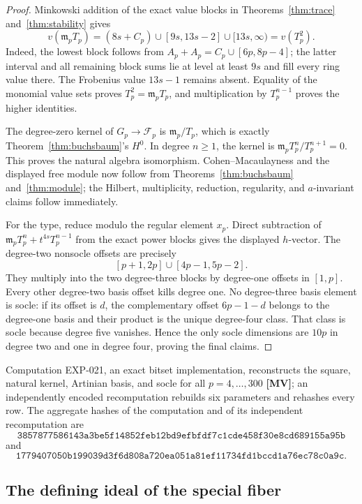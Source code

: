 \documentclass[11pt]{article}
\theoremstyle{definition}
\theoremstyle{remark}
\begin{document}
\begin{proof}
Minkowski addition of the exact value blocks in Theorems~\ref{thm:trace}
and~\ref{thm:stability} gives
\[
v(\mathfrak m_pT_p)=(8s+C_p)\cup[9s,13s-2]\cup[13s,\infty)=v(T_p^2).
\]
Indeed, the lowest block follows from
$A_p+A_p=C_p\cup[6p,8p-4]$; the latter interval and all remaining block sums lie at level at least
$9s$ and fill every ring value there. The Frobenius value $13s-1$ remains absent. Equality of the
monomial value sets proves $T_p^2=\mathfrak m_pT_p$, and multiplication by $T_p^{n-1}$ proves the
higher identities.

The degree-zero kernel of $G_p\to\mathcal F_p$ is $\mathfrak m_p/T_p$, which is exactly
Theorem~\ref{thm:buchsbaum}'s $H^0$. In degree $n\ge1$, the kernel is
$\mathfrak m_pT_p^n/T_p^{n+1}=0$. This proves the natural algebra isomorphism. Cohen--Macaulayness
and the displayed free module now follow from Theorems~\ref{thm:buchsbaum}
and~\ref{thm:module}; the Hilbert, multiplicity, reduction, regularity, and $a$-invariant claims
follow immediately.

For the type, reduce modulo the regular element $x_p$. Direct subtraction of
$\mathfrak m_pT_p^n+t^{4s}T_p^{n-1}$ from the exact power blocks gives the displayed $h$-vector.
The degree-two nonsocle offsets are precisely
\[
[p+1,2p]\cup[4p-1,5p-2].
\]
They multiply into the two degree-three blocks by degree-one offsets in $[1,p]$. Every other
degree-two basis offset kills degree one. No degree-three basis element is socle: if its offset is
$d$, the complementary offset $6p-1-d$ belongs to the degree-one basis and their product is the
unique degree-four class. That class is socle because degree five vanishes. Hence the only socle
dimensions are $10p$ in degree two and one in degree four, proving the final claims.
\end{proof}

Computation EXP-021, an exact bitset implementation, reconstructs the square, natural kernel,
Artinian basis, and socle for all $p=4,\ldots,300$ \textbf{[MV]}; an independently encoded
recomputation rebuilds six parameters and rehashes every row. The aggregate hashes of the
computation and of its independent recomputation are
\[
\texttt{3857877586143a3be5f14852feb12bd9efbfdf7c1cde458f30e8cd689155a95b}
\]
and
\[
\texttt{1779407050b199039d3f6d808a720ea051a81ef11734fd1bccd1a76ec78c0a9c}.
\]

\subsection{The defining ideal of the special fiber}
\end{document}
